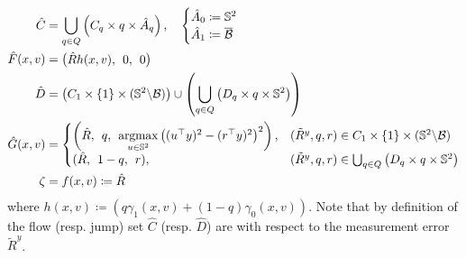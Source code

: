 \documentclass{article}
\newcommand{\brackets}[1]{\left(#1\right)}
\newcommand{\textblue}[1]{\textcolor{blue}{#1}}
\newcommand{\Rtilde}{\tilde{R}}
\begin{document}
\begin{subequations}\label{eq:hybrid_PCF}
\begin{align}
    \hat{C} &= \bigcup_{q\in Q}\brackets{{C}_{q}\times q \times \hat{A}_q}, \quad \begin{cases}
        \hat{A}_0 \coloneqq \mathbb{S}^2\\
        \hat{A}_1 \coloneqq \overline{\mathcal{B}}
    \end{cases}\\
    \hat{F}(x, v) &= \begin{pmatrix}
        \hat{R}h(x,v), \:\: 0, \:\: 0
    \end{pmatrix}\label{eq:13b}\\
    \hat{D} &= {\brackets{C_1\times\{1\}\times (\mathbb{S}^2\backslash \mathcal{B})} \cup \brackets{\bigcup_{q\in Q} \brackets{{D}_{q}\times q\times \mathbb{S}^2}}}\\
    \hat{G}(x, v) &= \left\{\begin{array}{@{}ll@{}}
        \brackets{\hat{R}, \:\: q,\:\: \underset{u\in\mathbb{S}^2}{\mathrm{argmax}}\left((u^\top y)^2 - (r^\top y)^2\right)^2}, &(\Rtilde^y, q, r)\in C_1\times \{1\}\times (\mathbb{S}^2\backslash \mathcal{B})\\
            (\hat{R}, \:\: 1-q,\:\: r),
        &(\Rtilde^y, q, r)\in \bigcup_{q\in Q} \brackets{{D}_{q}\times q\times \mathbb{S}^2}
    \end{array}\right.\\
    \zeta &= f(x,v)\coloneqq \hat{R} \label{eq:output_hybrid}
\end{align}
\end{subequations}
where $h(x,v)\coloneqq \left(q\gamma_1(x,v) + (1-q)\gamma_0(x,v)\right)$. Note that by definition of the flow (resp. jump) set $\hat{C}$ (resp. $\hat{D}$) are with respect to the measurement error $\Rtilde^y$. 



\end{document}
